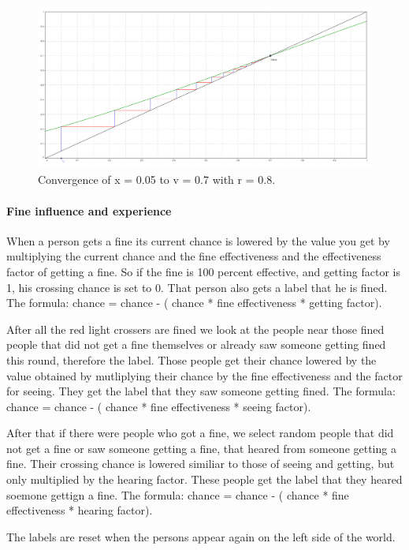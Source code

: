 \documentclass[a4paper]{article}
\begin{document}
\begin{figure}[H]
\centering
\includegraphics[width=.9\textwidth]{iteration2.png}
\caption{Convergence of x = 0.05 to v = 0.7 with r = 0.8.}
\label{ABlabel}
\end{figure}

\paragraph{Fine influence and experience}
When a person gets a fine its current chance is lowered by the value you get by multiplying the current chance and the fine effectiveness and the effectiveness factor of getting a fine. So if the fine is 100 percent effective, and getting factor is 1, his crossing chance is set to 0. That person also gets a label that he is fined.  The formula: chance = chance - ( chance * fine effectiveness * getting factor).

After all the red light crossers are fined we look at the people near those fined people that did not get a fine themselves or already saw someone getting fined this round, therefore the label. Those people get their chance lowered by the value obtained by mutliplying their chance by the fine effectiveness and the factor for seeing. They get the label that they saw someone getting fined. The formula: chance = chance - ( chance * fine effectiveness * seeing factor).

After that if there were people who got a fine, we select random people that did not get a fine or saw someone getting a fine, that heared from someone getting a fine. Their crossing chance is lowered similiar to those of seeing and getting, but only multiplied by the hearing factor. These people get the label that they heared soemone gettign a fine. The formula: chance = chance - ( chance * fine effectiveness * hearing factor).

The labels are reset when the persons appear again on the left side of the world. 
\end{document}
